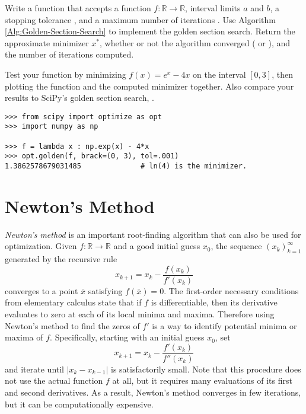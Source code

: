 \begin{problem} %
Write a function that accepts a function $f:\mathbb{R}\rightarrow\mathbb{R}$, interval limits $a$ and $b$, a stopping tolerance , and a maximum number of iterations .
Use Algorithm \ref{Alg:Golden-Section-Search} to implement the golden section search.
Return the approximate minimizer $x^*$, whether or not the algorithm converged ( or ), and the number of iterations computed.

Test your function by minimizing $f(x) = e^x - 4x$ on the interval $[0, 3]$, then plotting the function and the computed minimizer together.
Also compare your results to SciPy's golden section search, .

\begin{lstlisting}
>>> from scipy import optimize as opt
>>> import numpy as np

>>> f = lambda x : np.exp(x) - 4*x
>>> opt.golden(f, brack=(0, 3), tol=.001)
1.3862578679031485              # ln(4) is the minimizer.
\end{lstlisting}
\label{prob:golden-section-search}
\end{problem}

\section*{Newton's Method} %

\emph{Newton's method} is an important root-finding algorithm that can also be used for optimization.
Given $f:\mathbb{R}\rightarrow\mathbb{R}$ and a good initial guess $x_0$, the sequence $(x_k)_{k=1}^\infty$ generated by the recursive rule
\[
x_{k+1} = x_k - \frac{f(x_k)}{f'(x_k)}
\]
converges to a point $\bar{x}$ satisfying $f(\bar{x}) = 0$.
The first-order necessary conditions from elementary calculus state that if $f$ is differentiable, then its derivative evaluates to zero at each of its local minima and maxima.
Therefore using Newton's method to find the zeros of $f'$ is a way to identify potential minima or maxima of $f$.
Specifically, starting with an initial guess $x_0$, set
\begin{equation}
x_{k+1} = x_k - \frac{f'(x_k)}{f''(x_k)}
\label{eq:1dopt-newton}
\end{equation}
and iterate until $|x_k - x_{k-1}|$ is satisfactorily small.
Note that this procedure does not use the actual function $f$ at all, but it requires many evaluations of its first and second derivatives.
As a result, Newton's method converges in few iterations, but it can be computationally expensive.

